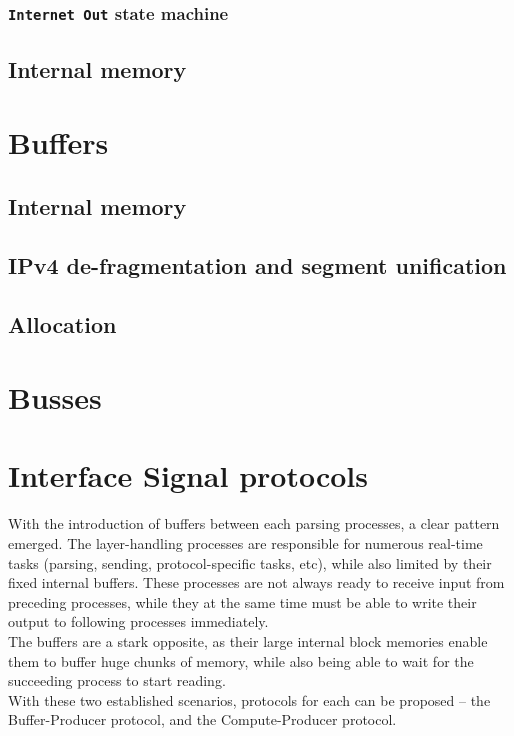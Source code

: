 \subsubsection{\texttt{Internet Out} state machine}


\subsection{Internal memory}


\section{Buffers}
\subsection{Internal memory}
\subsection{IPv4 de-fragmentation and segment unification}
\subsection{Allocation}


\section{Busses}
\section{Interface Signal protocols}
\label{sec:interface_signal_protocol}
With the introduction of buffers between each parsing processes, a clear pattern
emerged. The layer-handling processes are responsible for numerous real-time tasks
(parsing, sending, protocol-specific tasks, etc), while also limited by their
fixed internal buffers. These processes are not always ready to receive input
from preceding processes, while they at the same time must be able to write their
output to following processes immediately.\\
The buffers are a stark opposite, as their large internal block memories enable
them to buffer huge chunks of memory, while also being able to wait for the
succeeding process to start reading.\\
With these two established scenarios, protocols for each can be proposed -- the
Buffer-Producer protocol, and the Compute-Producer protocol.

